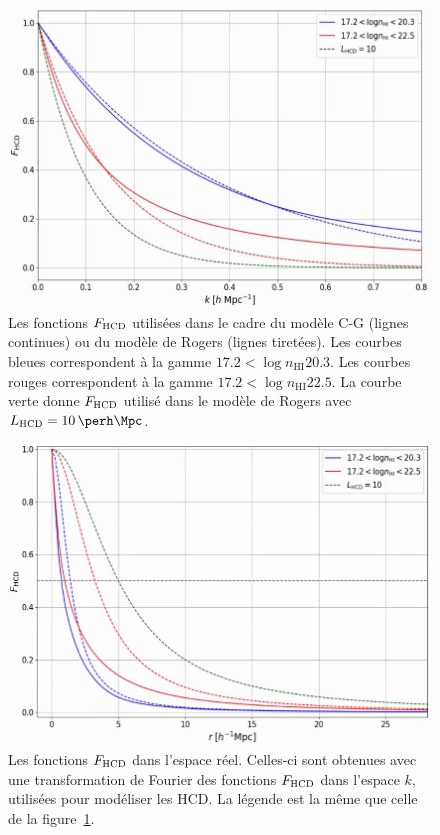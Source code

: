 \documentclass[11pt, twoside, a4paper, openright]{report}
\begin{document}
\begin{figure}
  \centering
  \includegraphics[scale=0.4]{f_hcd_range}
  \caption{Les fonctions $F_{\textsc{HCD}}$ utilisées dans le cadre du modèle C-G (lignes continues) ou du modèle de Rogers (lignes tiretées).
    Les courbes bleues correspondent à la gamme $\num{17.2} < \log n_{\mathrm{HI}} \num{20.3}$. Les courbes rouges correspondent à la gamme $\num{17.2} < \log n_{\mathrm{HI}} \num{22.5}$. La courbe verte donne $F_{\textsc{HCD}}$ utilisé dans le modèle de Rogers avec $L_{\textsc{HCD}} = \SI{10}{\perh\Mpc}$.
}
  \label{fig:f_hcd_range}
\end{figure}

\begin{figure}
  \centering
  \includegraphics[scale=0.4]{f_hcd_range_real}
  \caption{Les fonctions $F_{\textsc{HCD}}$ dans l'espace réel. Celles-ci sont obtenues avec une transformation de Fourier des fonctions $F_{\textsc{HCD}}$ dans l'espace $k$, utilisées pour modéliser les HCD.
    La légende est la même que celle de la figure~\ref{fig:f_hcd_range}.
}
  \label{fig:f_hcd_range_real}
\end{figure}
\end{document}
